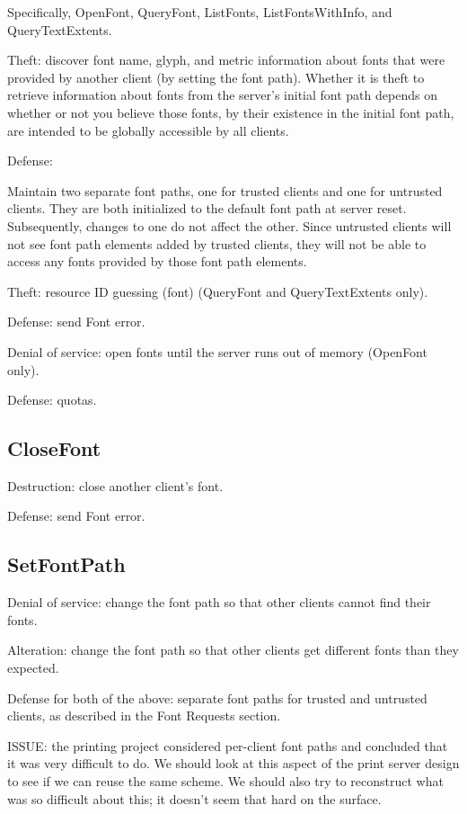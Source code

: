 \documentclass{article}
\begin{document}
Specifically, OpenFont, QueryFont, ListFonts, ListFontsWithInfo, and
QueryTextExtents.

Theft: discover font name, glyph, and metric information about fonts
that were provided by another client (by setting the font path).
Whether it is theft to retrieve information about fonts from the
server's initial font path depends on whether or not you believe those
fonts, by their existence in the initial font path, are intended to be
globally accessible by all clients.

Defense:

Maintain two separate font paths, one for trusted clients and one for
untrusted clients.  They are both initialized to the default font path
at server reset.  Subsequently, changes to one do not affect the
other.  Since untrusted clients will not see font path elements added
by trusted clients, they will not be able to access any fonts provided
by those font path elements.

Theft: resource ID guessing (font) (QueryFont and QueryTextExtents only).

Defense: send Font error.

Denial of service: open fonts until the server runs out of memory
(OpenFont only).

Defense: quotas.


\subsection{CloseFont}

Destruction: close another client's font.

Defense: send Font error.



\subsection{SetFontPath}

Denial of service: change the font path so that other clients cannot
find their fonts.

Alteration: change the font path so that other clients get different
fonts than they expected.

Defense for both of the above: separate font paths for trusted and
untrusted clients, as described in the Font Requests section.

ISSUE: the printing project considered per-client font paths and
concluded that it was very difficult to do.  We should look at this
aspect of the print server design to see if we can reuse the same
scheme.  We should also try to reconstruct what was so difficult about
this; it doesn't seem that hard on the surface.
\end{document}
